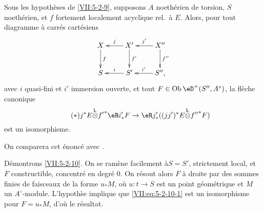 \begin{proposition}\label{VII:5-2-10}
Sous les hypothèses de \ref{VII:5-2-9}, supposons $A$ noethérien de 
torsion, $S$ noethérien, et $f$ fortement localement acyclique rel.\ à $E$. 
Alors, pour tout diagramme à carrés cartésiens 
\[\xymatrix{
  X \ar[d]^-f 
    & \ar[l]_-j X' \ar[d]^-{f'} 
    & \ar[l]_-{j'} X'' \ar[d]^-{f''} \\
  S 
    & \ar[l]_-i S' 
    & \ar[l]_-{i'} S'' \text{,} 
}\]
avec $i$ quasi-fini et $i'$ immersion ouverte, et tout 
$F\in\ob\eD^+(S'',A^\circ)$, la flèche canonique 
\begin{equation*}\tag{$*$}\label{VII:eq:5-2-10-1}
  j^\ast E \lotimes {f'}^\ast \eR i_\ast' F \to \eR j_\ast' ((j j')^\ast E\lotimes {f''}^\ast F) 
\end{equation*}
est un isomorphisme. 
\end{proposition}

On comparera cet énoncé avec \cite[XV 1.17]{sga4}. 

Démontrons \ref{VII:5-2-10}. On se ramène facilement à$S=S'$, 
strictement local, et $F$ constructible, concentré en degré $0$. On 
résout alors $F$ à droite par des sommes finies de faisceaux de la forme 
$u_\ast M$, où $u:t\to S$ est un point géométrique et $M$ un 
$A^\circ$-module. L'hypoth\`se implique que \eqref{VII:eq:5-2-10-1} est un 
isomorphisme pour $F=u_\ast M$, d'où le résultat. 



